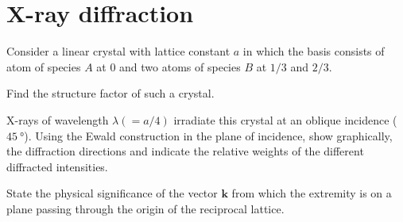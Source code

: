 
\section{X-ray diffraction}

\begin{problem}
  Consider a linear crystal with lattice constant $a$ in which the basis
  consists of atom of species $A$ at $0$ and two atoms of species $B$ at $1/3$
  and $2/3$.
  \begin{enumext}
    \item Find the structure factor of such a crystal.
    \item X-rays of wavelength $\lambda (= a/4)$ irradiate this crystal at an
    oblique incidence ($\qty{45}\degree$). Using the Ewald construction in the
    plane of incidence, show graphically, the diffraction directions and
    indicate the relative weights of the different diffracted intensities.
    \item State the physical significance of the vector $\bm k$ from which the
    extremity is on a plane passing through the origin of the reciprocal lattice.
  \end{enumext}
\end{problem}
